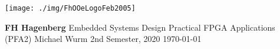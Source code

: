 \thispagestyle{empty} %
\hfill
\texttt{[image: ./img/FhOOeLogoFeb2005]}

\begin{center}
	\textbf{\Large }
	\linebreak
	\linebreak
	\linebreak
	\linebreak
	\linebreak
	\horizontalLine{0.5 mm}
	\linebreak
	\linebreak
	\textbf{\huge \UebungNr}
	\linebreak
	\linebreak
	\linebreak
	\textbf{\LARGE \UebungTopic}
	\linebreak
	\linebreak
	\horizontalLine{0.5 mm}
	\linebreak
	\linebreak
	\linebreak
	\linebreak
	\linebreak
	\linebreak
	\Large {\textbf{FH Hagenberg}}
	\linebreak
	\linebreak
	\Large { Embedded Systems Design }
	\linebreak
	\linebreak
	\Large { Practical FPGA Applications (PFA2) }
	\linebreak
	\linebreak
	\linebreak
	\linebreak
	\linebreak
	\Large {Michael Wurm}
	\linebreak
	\linebreak
	\linebreak
	\linebreak
	\linebreak
	\normalsize{ 2nd Semester, 2020 }
	\linebreak
	\linebreak
	\large{\today}

\end{center}
